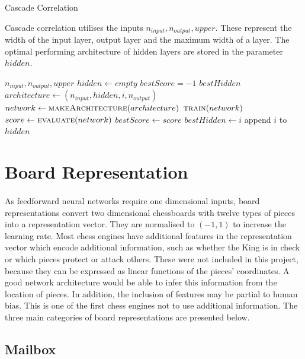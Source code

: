 \documentclass[12pt,a4paper]{book}
\begin{document}
\begin{algorithm}
  \caption{Cascade Correlation}
  Cascade correlation utilises the inputs $n_{input}, n_{output}, upper$. These represent the width of the input layer, output layer and the maximum width of a layer. The optimal performing architecture of hidden layers are stored in the parameter $hidden$.
  \begin{algorithmic}[1]
     {$n_{input}, n_{output}, upper$}
    \State $hidden \gets empty$
    \State $bestScore = -1$
    \State $bestHidden$
    \State $architecture \gets (n_{input}, hidden, i, n_{output})$
    \State $network \gets \Call{makeArchitecture}{architecture}$
    \State $\Call{train}{network}$
    \State $score \gets \Call{evaluate}{network}$
    \State $bestScore \gets score$
    \State $bestHidden \gets i$
	\EndIf
    \EndFor
    \State append $i$ to $hidden$
    \EndWhile
    \EndFunction
  \end{algorithmic}
\end{algorithm}

\section{Board Representation}

\paragraph{} As feedforward neural networks require one dimensional inputs, board representations convert two dimensional chessboards with twelve types of pieces into a representation vector. They are normalised to $(-1, 1)$ to increase the learning rate. Most chess engines have additional features in the representation vector which encode additional information, such as whether the King is in check or which pieces protect or attack others. These were not included in this project, because they can be expressed as linear functions of the pieces' coordinates. A good network architecture would be able to infer this information from the location of pieces. In addition, the inclusion of features may be partial to human bias. This is one of the first chess engines not to use additional information. The three main categories of board representations are presented below. \cite{giraffe} \cite{represent}

\subsection{Mailbox}
\end{document}
